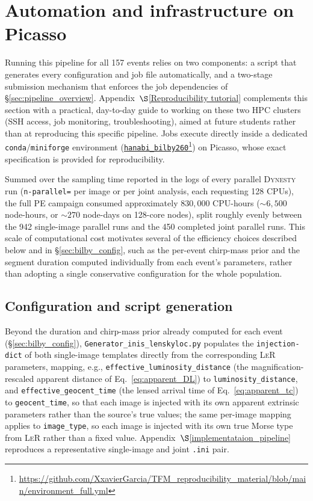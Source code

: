 \section{Automation and infrastructure on Picasso}
\label{sec:automation_picasso}

Running this pipeline for all 157 events relies on two components: a script that generates every configuration and job file automatically, and a two-stage submission mechanism that enforces the job dependencies of \S\ref{sec:pipeline_overview}. Appendix~$\S$\ref{Reproducibility tutorial} complements this section with a practical, day-to-day guide to working on these two HPC clusters (SSH access, job monitoring, troubleshooting), aimed at future students rather than at reproducing this specific pipeline. Jobs execute directly inside a dedicated \texttt{conda}/\texttt{miniforge} environment (\href{https://github.com/XxavierGarcia/TFM_reproducibility_material/blob/main/environment_full.yml}{\texttt{hanabi\_bilby260}}\footnote{\url{https://github.com/XxavierGarcia/TFM_reproducibility_material/blob/main/environment_full.yml}}) on Picasso, whose exact specification is provided for reproducibility.

Summed over the sampling time reported in the logs of every parallel \textsc{Dynesty} run (\texttt{n-parallel\allowbreak =} per image or per joint analysis, each requesting 128 CPUs), the full PE campaign consumed approximately $830{,}000$ CPU-hours ($\sim\!6{,}500$ node-hours, or $\sim\!270$ node-days on 128-core nodes), split roughly evenly between the 942 single-image parallel runs and the 450 completed joint parallel runs. This scale of computational cost motivates several of the efficiency choices described below and in \S\ref{sec:bilby_config}, such as the per-event chirp-mass prior and the segment duration computed individually from each event's parameters, rather than adopting a single conservative configuration for the whole population.

\subsection{Configuration and script generation}

Beyond the duration and chirp-mass prior already computed for each event (\S\ref{sec:bilby_config}), \texttt{Generator\_\allowbreak inis\_\allowbreak lenskyloc.py} populates the \texttt{injection-dict} of both single-image templates directly from the corresponding \textsc{LeR} parameters, mapping, e.g., \texttt{effective\_\allowbreak luminosity\_\allowbreak distance} (the magnification-rescaled apparent distance of Eq.~\eqref{eq:apparent_DL}) to \texttt{luminosity\_\allowbreak distance}, and \texttt{effective\_\allowbreak geocent\_\allowbreak time} (the lensed arrival time of Eq.~\eqref{eq:apparent_tc}) to \texttt{geocent\_time}, so that each image is injected with its own apparent extrinsic parameters rather than the source's true values; the same per-image mapping applies to \texttt{image\_type}, so each image is injected with its own true Morse type from \textsc{LeR} rather than a fixed value. Appendix~$\S$\ref{implementataion_pipeline} reproduces a representative single-image and joint \texttt{.ini} pair.

